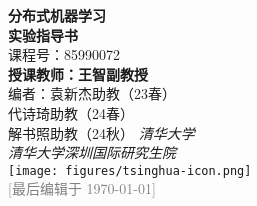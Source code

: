 \thispagestyle{empty}
\begin{titlepage}
    \begin{center}
        \vspace*{0pt}
        \makeatletter    
        \Large{\textbf{分布式机器学习}\\}
        \vspace{1ex}
        \Huge{\textbf{实验指导书}\\}
        \vspace{1ex}
        \small{课程号：85990072\\}
        \large
        \vspace{5ex}
        \textbf{授课教师：王智副教授}\\
        \vspace{.5ex}
        编者：袁新杰助教（23春）\\
        \hspace{3em}代诗琦助教（24春）\\
        \hspace{3em}解书照助教（24秋）
        \vfill
        \large\textit{清华大学}\\
        \large\textit{清华大学深圳国际研究生院}\\
        \vspace{3ex}
        \texttt{[image: figures/tsinghua-icon.png]}\\
        \vspace{2ex}
        \large
        \vspace{.5ex}
        \footnotesize \textcolor{gray}{[最后编辑于 \today]}
        \makeatother
    \end{center}
\end{titlepage}